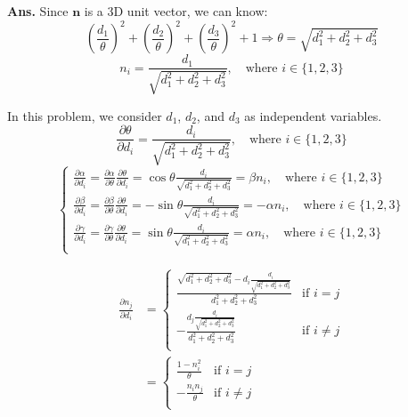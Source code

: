 \documentclass[12pt, a4paper, UTF8, fontset=windows]{ctexbook}
\newenvironment{solution}{\par\noindent\textbf{Ans.}}{\par}
\begin{document}
\begin{solution}
    Since $\mathbf{n}$ is a 3D unit vector, we can know:
    $$
    (\frac{d_1}{\theta})^2 + (\frac{d_2}{\theta})^2 + (\frac{d_3}{\theta})^2 + 1
    \Rightarrow
    \theta = \sqrt{d_1^2 + d_2^2 + d_3^2}
    $$
    $$
    n_i = \frac{d_1}{\sqrt{d_1^2 + d_2^2 + d_3^2}}, \quad \text{where } i \in \{1, 2, 3\}
    $$

    In this problem, we consider $d_1$, $d_2$, and $d_3$ as independent variables.
    $$
    \frac{\partial \theta}{\partial d_i} = \frac{d_i}{\sqrt{d_1^2 + d_2^2 + d_3^2}}, \quad \text{where } i \in \{1, 2, 3\}
    $$
    $$
    \begin{cases}
    \frac{\partial \alpha}{\partial d_i}
    =\frac{\partial \alpha}{\partial \theta} \frac{\partial \theta}{\partial d_i}
    = \cos \theta \frac{d_i}{\sqrt{d_1^2 + d_2^2 + d_3^2}}
    = \beta n_i , \quad \text{where } i \in \{1, 2, 3\} \\
    \frac{\partial \beta}{\partial d_i}
    = \frac{\partial \beta}{\partial \theta} \frac{\partial \theta}{\partial d_i}
    = -\sin \theta \frac{d_i}{\sqrt{d_1^2 + d_2^2 + d_3^2}}
    = -\alpha n_i , \quad \text{where } i \in \{1, 2, 3\} \\
    \frac{\partial \gamma}{\partial d_i}
    = \frac{\partial \gamma}{\partial \theta} \frac{\partial \theta}{\partial d_i}
    = \sin \theta \frac{d_i}{\sqrt{d_1^2 + d_2^2 + d_3^2}}
    = \alpha n_i , \quad \text{where } i \in \{1, 2, 3\} \\
    \end{cases}
    $$

    \begin{align*}
    \frac{\partial n_j}{\partial d_i} 
    &=
    \begin{cases}
        \frac{\sqrt{d_1^2 + d_2^2 + d_3^2} - d_i \frac{d_i}{\sqrt{d_1^2 + d_2^2 + d_3^2}}}{d_1^2 + d_2^2 + d_3^2} & \text{if } i = j \\
        - \frac{d_j \frac{d_i}{\sqrt{d_1^2 + d_2^2 + d_3^2}}}{d_1^2 + d_2^2 + d_3^2} & \text{if } i \neq j \\
    \end{cases} \\
    &= 
    \begin{cases}
        \frac{1 - n_i^2}{\theta} & \text{if } i = j \\
        -\frac{n_i n_j}{\theta} & \text{if } i \neq j \\
    \end{cases} \\
    \end{align*}
    

\end{solution}
\end{document}
